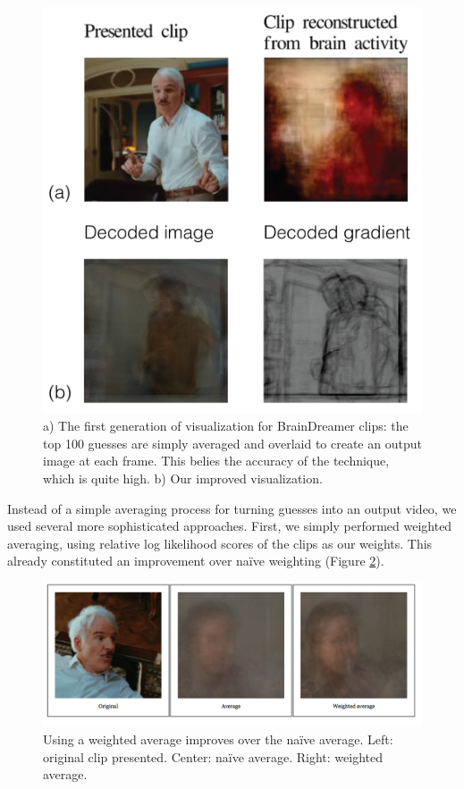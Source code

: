\begin{figure}[t]
\centering
    \includegraphics[width=1.0\columnwidth]{figures/fig1B.png}
\caption{a) The first generation of visualization for BrainDreamer clips: the top 100 guesses are simply averaged and overlaid to create an output image at each frame.  This belies the accuracy of the technique, which is quite high. b) Our improved visualization.}
\label{fig:avg}
\end{figure}


Instead of a simple averaging process for turning guesses into an output video, we used several more sophisticated approaches.  First, we simply performed weighted averaging, using relative log likelihood scores of the clips as our weights.  This already constituted an improvement over na\"{i}ve weighting (Figure \ref{fig:weighted}).

\begin{figure}[t]
\centering
    \includegraphics[width=1.0\columnwidth]{figures/orig-avg-weighted.png}
\caption{Using a weighted average improves over the na\"{i}ve average.  Left: original clip presented.  Center: na\"{i}ve average.  Right: weighted average.}
\label{fig:weighted}
\end{figure}


